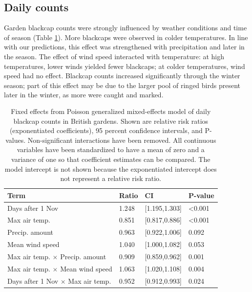 \documentclass[a4paper, twoside]{templates/ociamthesis}
\begin{document}
\hypertarget{daily-counts-1}{%
\subsection{Daily counts}\label{daily-counts-1}}

Garden blackcap counts were strongly influenced by weather conditions and time of season (Table \ref{tab:daily-model-table}). More blackcaps were observed in colder temperatures. In line with our predictions, this effect was strengthened with precipitation and later in the season. The effect of wind speed interacted with temperature: at high temperatures, lower winds yielded fewer blackcaps; at colder temperatures, wind speed had no effect. Blackcap counts increased significantly through the winter season; part of this effect may be due to the larger pool of ringed birds present later in the winter, as more were caught and marked.

\begin{table}[t]

\caption{\label{tab:daily-model-table}Fixed effects from Poisson generalized mixed-effects model of daily blackcap counts in British gardens. Shown are relative risk ratios (exponentiated coefficients), 95 percent confidence intervals, and P-values. Non-significant interactions have been removed. All continuous variables have been standardized to have a mean of zero and a variance of one so that coefficient estimates can be compared. The model intercept is not shown because the exponentiated intercept does not represent a relative risk ratio.}
\centering
\begin{tabular}{l|l|l|l}
\hline
Term & Ratio & CI & P-value\\
\hline
Days after 1 Nov & 1.248 & [1.195,1.303] & <0.001\\
\hline
Max air temp. & 0.851 & [0.817,0.886] & <0.001\\
\hline
Precip. amount & 0.963 & [0.922,1.006] & 0.092\\
\hline
Mean wind speed & 1.040 & [1.000,1.082] & 0.053\\
\hline
Max air temp. $\times$ Precip. amount & 0.909 & [0.859,0.962] & 0.001\\
\hline
Max air temp. $\times$ Mean wind speed & 1.063 & [1.020,1.108] & 0.004\\
\hline
Days after 1 Nov $\times$ Max air temp. & 0.952 & [0.912,0.993] & 0.024\\
\hline
\end{tabular}
\end{table}
\end{document}
